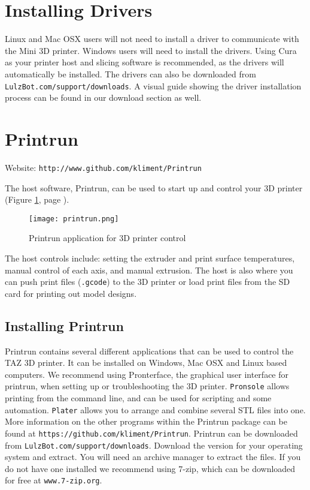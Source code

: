 \section{Installing Drivers}
Linux and Mac OSX users will not need to install a driver to communicate with the Mini 3D printer. Windows users will need to install the drivers. Using Cura as your printer host and slicing software is recommended, as the drivers will automatically be installed. The drivers can also be downloaded from \texttt{LulzBot.com/support/downloads}. A visual guide showing the driver installation process can be found in our download section as well.

\section{Printrun}
\label{Printrun}
Website: \texttt{http://www.github.com/kliment/Printrun}

The host software, Printrun, can be used to start up and control your 3D printer (Figure \ref{fig:printrun}, page \pageref{fig:printrun}).
\begin{figure}[hbt]
\centering
\texttt{[image: printrun.png]}
\caption{Printrun application for 3D printer control}
\label{fig:printrun}
\end{figure}
The host controls include: setting the extruder and print surface temperatures, manual control of each axis, and manual extrusion. The host is also where you can push print files (\texttt{.gcode}) to the 3D printer or load print files from the SD card for printing out model designs.

\subsection{Installing Printrun}
Printrun contains several different applications that can be used to control the TAZ 3D printer. It can be installed on Windows, Mac OSX and Linux based computers. We recommend using Pronterface, the graphical user interface for printrun, when setting up or troubleshooting the 3D printer. \texttt{Pronsole} allows printing from the command line, and can be used for scripting and some automation. \texttt{Plater} allows you to arrange and combine several STL files into one. More information on the other programs within the Printrun package can be found at \texttt{https://github.com/kliment/Printrun}. Printrun can be downloaded from \texttt{LulzBot.com/support/downloads}. Download the version for your operating system and extract. You will need an archive manager to extract the files. If you do not have one installed we recommend using 7-zip, which can be downloaded for free at \texttt{www.7-zip.org}.

